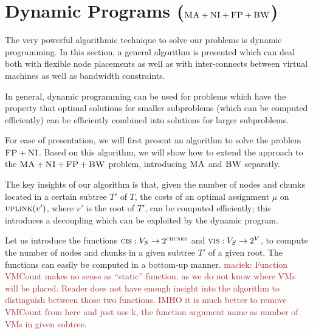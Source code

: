 \documentclass[9pt,twocolumn]{scrartcl}
\newcommand{\maciek}[1]{\textcolor{brown}{maciek: #1}}
\newcommand{\VmChunkAssignment}{\mu}
\newcommand{\VirtualNodes}{\ensuremath{V}}
\newcommand{\SubstrateNodes}{\ensuremath{V_S}}
\newcommand{\SubstrateNode}{\ensuremath{v}}
\newcommand{\Chunks}{\ensuremath{\textsc{chunks}}}
\newcommand{\Uplink}{\ensuremath{\textsc{uplink}}}
\newcommand{\ChunkCount}{\ensuremath{\textsc{cis}}}
\newcommand{\VmCount}{\ensuremath{\textsc{vis}}}
\newcommand{\CC}{\textsc{NI}}
\newcommand{\FP}{\textsc{FP}}
\newcommand{\BW}{\textsc{BW}}
\newcommand{\MA}{\textsc{MA}}
\newcommand{\Tree}{\ensuremath{T}}
\begin{document}
\begin{appendix}
\begin{algorithm}[tbhp]
\caption{$binarize(\SubstrateNode \in \SubstrateNodes)$}
\label{algo:binarization}
\end{algorithm}


\section{Dynamic Programs ($\MA+\CC+\FP+\BW$)}

The very powerful algorithmic technique to solve our problems
is dynamic programming. In this section, a general algorithm
is presented which can deal both with flexible node placements
as well as with inter-connects between virtual machines as well
as bandwidth constraints.

In general, dynamic programming can be used for problems which have
the property that optimal solutions for smaller subproblems (which can be computed efficiently)
can be efficiently combined into solutions for larger subproblems.

For ease of presentation, we will first present an algorithm to solve
the problem $\FP+\CC$. Based on this algorithm, we will show how to extend
the approach to the $\MA+\CC+\FP+\BW$ problem, introducing $\MA$ and $\BW$ separatly.


The key insights of our algorithm is that, given the
number of nodes and chunks located in a certain  subtree $\Tree'$ of $\Tree$, the
costs of an optimal assignment $\VmChunkAssignment$ on
$\Uplink(\SubstrateNode')$, where $\SubstrateNode'$ is the root of $\Tree'$,
can be computed efficiently; this introduces a decoupling which can be exploited by the
dynamic program.

Let us introduce the
functions $\ChunkCount : \SubstrateNodes
\rightarrow
2^\Chunks$
and $\VmCount : \SubstrateNodes \rightarrow 2^{\VirtualNodes}$,
to compute the number of nodes and chunks in a given subtree $\Tree'$
of a given root. The functions can
easily be computed in a
bottom-up manner. \maciek{Function VMCount makes no sense as ``static'' function, as we do not know where VMs will be placed. Reader does not have enough insight into the algorithm to distinguish between those two functions. IMHO it is much better to remove VMCount from here and just use k, the function argument name as number of VMs in given subtree.}


\end{appendix}
\end{document}
